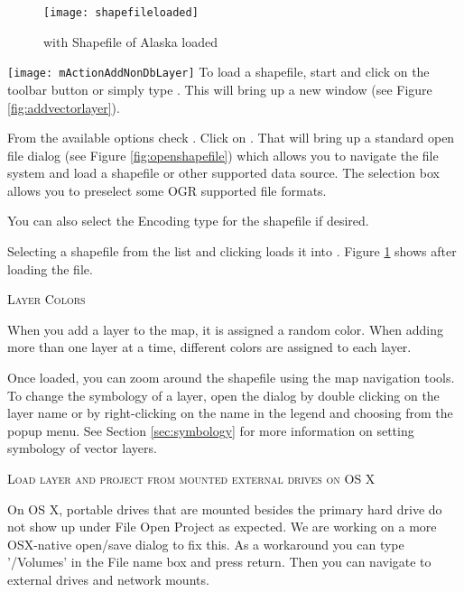 \begin{figure}[ht]
   \centering
   \texttt{[image: shapefileloaded]}
   \caption{\qg with Shapefile of Alaska loaded \nixcaption}\label{fig:loadedshapefile}
\end{figure}

\texttt{[image: mActionAddNonDbLayer]} To load a shapefile, start
\qg and click on the 
toolbar button or simply type .
This will bring up a new window (see Figure \ref{fig:addvectorlayer}).

From the available options check . Click on .
That will bring up a standard open file dialog (see Figure
\ref{fig:openshapefile}) which allows you to navigate the file system and load
a shapefile or other supported data source.
The selection box  allows you to preselect some OGR supported file formats.

You can also select the Encoding type for the shapefile if desired.

Selecting a shapefile from the list and clicking  loads it into \qg. Figure
\ref{fig:loadedshapefile} shows \qg after loading the  file.


\begin{Tip}\caption{\textsc{Layer Colors}}
When you add a layer to the map, it is assigned a random color. When
adding more than one layer at a time, different colors are assigned to each layer.
\end{Tip}

Once loaded, you can zoom around the shapefile using the map navigation tools.
To change the symbology of a layer, open the  dialog by double
clicking on the layer name or by right-clicking on the name in the legend and
choosing  from the popup menu. See
Section \ref{sec:symbology} for more information on setting symbology of
vector layers.

\begin{Tip}\caption{\textsc{Load layer and project from mounted external
drives on OS X}}
On OS X, portable drives that are mounted besides the primary hard
drive do not show up under File \arrow Open Project as expected. We are working
on a more OSX-native open/save dialog to fix this. As a workaround you can
type '/Volumes' in the File name box and press return. Then you can navigate
to external drives and network mounts.
\end{Tip}

